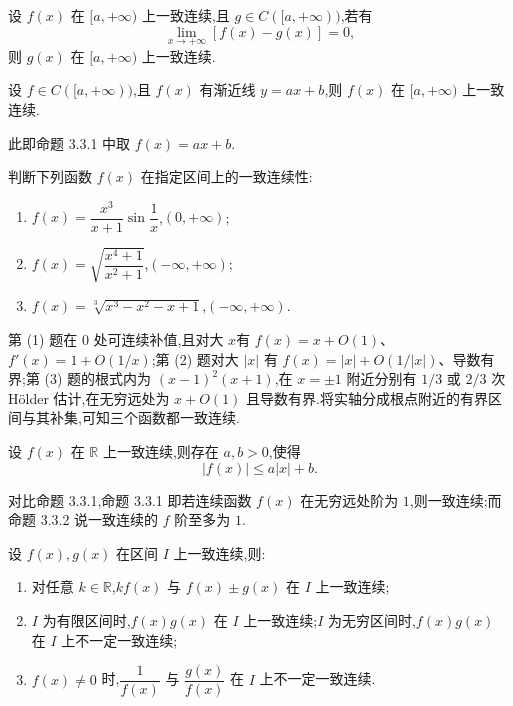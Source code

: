 \begin{proposition}[\markstar]
    设 $f(x)$ 在 $\lbrack a,+\infty)$ 上一致连续,且 $g\in C(\lbrack a,+\infty))$,若有
    \[
        \lim\limits_{x\to+\infty}[f(x)-g(x)]=0,
    \]
    则 $g(x)$ 在 $\lbrack a,+\infty)$ 上一致连续.
\end{proposition}

\begin{corollary}[\markstar]
    设 $f\in C(\lbrack a,+\infty))$,且 $f(x)$ 有渐近线 $y=ax+b$,则 $f(x)$ 在 $\lbrack a,+\infty)$ 上一致连续.
\end{corollary}

\begin{remark}
    此即命题 3.3.1 中取 $f(x)=ax+b$.
\end{remark}

\begin{example}
    判断下列函数 $f(x)$ 在指定区间上的一致连续性:
    \begin{enumerate}
        \item $f(x)=\dfrac{x^3}{x+1}\sin\dfrac{1}{x}$,$(0,+\infty)$;
        \item $f(x)=\sqrt{\dfrac{x^4+1}{x^2+1}}$,$(-\infty,+\infty)$;
        \item $f(x)=\sqrt[3]{x^3-x^2-x+1}$,$(-\infty,+\infty)$.
    \end{enumerate}
\end{example}
\exampleblank

\begin{solution}
    第 (1) 题在 $0$ 处可连续补值,且对大 $x$有 $f(x)=x+O(1)$、$f'(x)=1+O(1/x)$;第 (2) 题对大 $|x|$ 有 $f(x)=|x|+O(1/|x|)$、导数有界;第 (3) 题的根式内为 $(x-1)^2(x+1)$,在 $x=\pm1$ 附近分别有 $1/3$ 或 $2/3$ 次 Hölder 估计,在无穷远处为 $x+O(1)$ 且导数有界.将实轴分成根点附近的有界区间与其补集,可知三个函数都一致连续.
\end{solution}

\begin{proposition}
    设 $f(x)$ 在 $\mathbb{R}$ 上一致连续,则存在 $a,b>0$,使得
    \[
        |f(x)|\leq a|x|+b.
    \]
\end{proposition}

\begin{remark}
    对比命题 3.3.1,命题 3.3.1 即若连续函数 $f(x)$ 在无穷远处阶为 $1$,则一致连续;而命题 3.3.2 说一致连续的 $f$ 阶至多为 $1$.
\end{remark}

\begin{proposition}
    设 $f(x),g(x)$ 在区间 $I$ 上一致连续,则:
    \begin{enumerate}
        \item 对任意 $k\in\mathbb{R}$,$kf(x)$ 与 $f(x)\pm g(x)$ 在 $I$ 上一致连续;
        \item $I$ 为有限区间时,$f(x)g(x)$ 在 $I$ 上一致连续;$I$ 为无穷区间时,$f(x)g(x)$ 在 $I$ 上不一定一致连续;
        \item $f(x)\neq0$ 时,$\dfrac{1}{f(x)}$ 与 $\dfrac{g(x)}{f(x)}$ 在 $I$ 上不一定一致连续.
    \end{enumerate}
\end{proposition}

